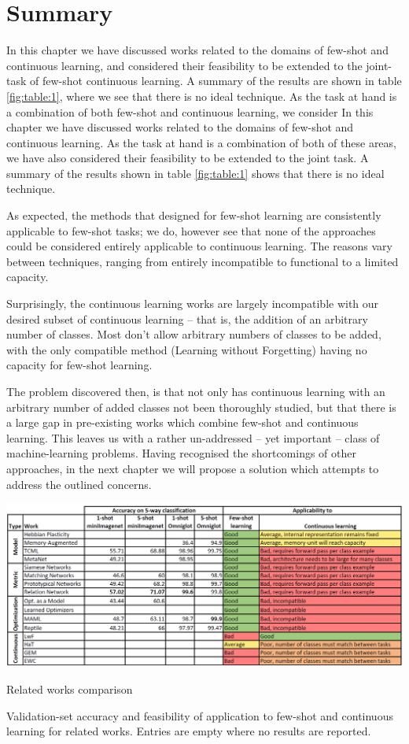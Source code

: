 \documentclass{report}
\begin{document}
	\section{Summary} \label{works:summary}
	In this chapter we have discussed works related to the domains of few-shot and continuous learning, and considered their feasibility to be extended to the joint-task of few-shot continuous learning. A summary of the results are shown in table \ref{fig:table:1}, where we see that there is no ideal technique. As the task at hand is a combination of both few-shot and continuous learning, we consider
	In this chapter we have discussed works related to the domains of few-shot and continuous learning. As the task at hand is a combination of both of these areas, we have also considered their feasibility to be extended to the joint task. A summary of the results shown in table \ref{fig:table:1} shows that there is no ideal technique. \par
	As expected, the methods that designed for few-shot learning are consistently applicable to few-shot tasks; we do, however see that none of the approaches could be considered entirely applicable to continuous learning. The reasons vary between techniques, ranging from entirely incompatible to functional to a limited capacity. \par
	Surprisingly, the continuous learning works are largely incompatible with our desired subset of continuous learning -- that is, the addition of an arbitrary number of classes. Most don't allow arbitrary numbers of classes to be added, with the only compatible method (Learning without Forgetting) having no capacity for few-shot learning. \par
	The problem discovered then, is that not only has continuous learning with an arbitrary number of added classes not been thoroughly studied, but that there is a large gap in pre-existing works which combine few-shot and continuous learning. This leaves us with a rather un-addressed -- yet important -- class of machine-learning problems. Having recognised the shortcomings of other approaches, in the next chapter we will propose a solution which attempts to address the outlined concerns. \par
	\begin{table}[h]
		\centering
		\includegraphics[width=17cm]{table}
		\caption{Related works comparison}
		\label{fig:table:1}
		Validation-set accuracy and feasibility of application to few-shot and continuous learning for related works. Entries are empty where no results are reported.
	\end{table}
\end{document}
